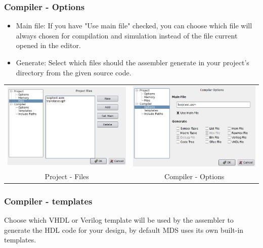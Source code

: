         \subsubsection{Compiler - Options}
            \begin{itemize}
                \item
                    Main file: If you have "Use main file" checked, you can choose which file will always chosen for compilation and simulation instead of the file current opened in the editor.
                \item
                    Generate: Select which files should the assembler generate in your project's directory from the given source code.
            \end{itemize}

            \begin{table}[h!]
                \begin{tabular}{cc}
                    \includegraphics[width=.5\textwidth]{img/config3.png}
                        &
                    \includegraphics[width=.5\textwidth]{img/config4.png}
                        \\
                    Project - Files & Compiler - Options
                \end{tabular}
            \end{table}

        \subsubsection{Compiler - templates}
            Choose which VHDL or Verilog template will be used by the assembler to generate the HDL code for your
            design, by default MDS uses its own built-in templates.

